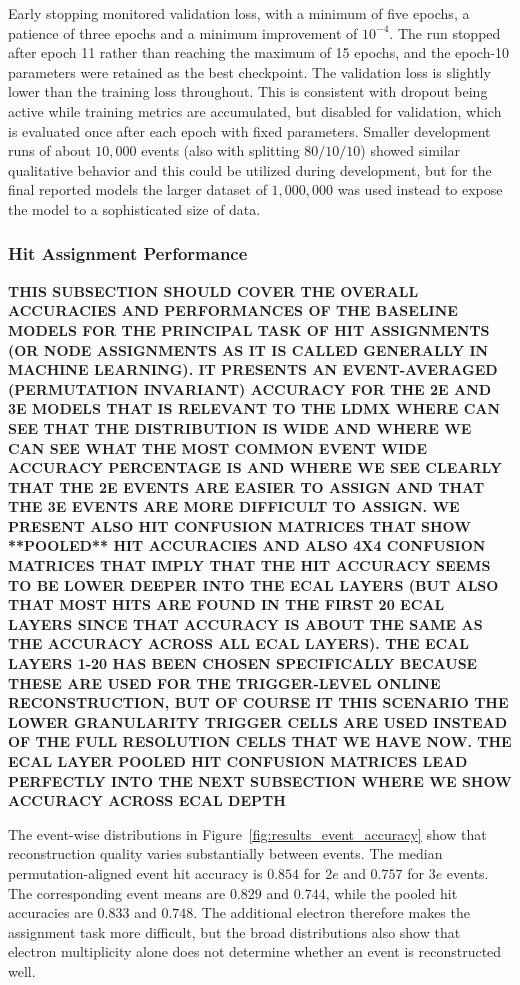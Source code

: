 Early stopping monitored validation loss, with a minimum of five epochs, a
patience of three epochs and a minimum improvement of \(10^{-4}\). The run
stopped after epoch 11 rather than reaching the maximum of 15 epochs, and the
epoch-10 parameters were retained as the best checkpoint. The validation loss
is slightly lower than the training loss throughout. This is consistent with
dropout being active while training metrics are accumulated, but disabled for
validation, which is evaluated once after each epoch with fixed parameters.
Smaller development runs of about $10,000$ events (also with splitting $80/10/10$) showed similar qualitative behavior and this could be utilized during development, but for the final reported models the larger dataset of $1,000,000$ was used instead to expose the model to a sophisticated size of data. 



\clearpage
\subsubsection{Hit Assignment Performance}

\textbf{THIS SUBSECTION SHOULD COVER THE OVERALL ACCURACIES AND PERFORMANCES OF THE BASELINE MODELS FOR THE PRINCIPAL TASK OF HIT ASSIGNMENTS (OR NODE ASSIGNMENTS AS IT IS CALLED GENERALLY IN MACHINE LEARNING). IT PRESENTS AN EVENT-AVERAGED (PERMUTATION INVARIANT) ACCURACY FOR THE 2E AND 3E MODELS THAT IS RELEVANT TO THE LDMX WHERE CAN SEE THAT THE DISTRIBUTION IS WIDE AND WHERE WE CAN SEE WHAT THE MOST COMMON EVENT WIDE ACCURACY PERCENTAGE IS AND WHERE WE SEE CLEARLY THAT THE 2E EVENTS ARE EASIER TO ASSIGN AND THAT THE 3E EVENTS ARE MORE DIFFICULT TO ASSIGN. WE PRESENT ALSO HIT CONFUSION MATRICES THAT SHOW **POOLED** HIT ACCURACIES AND ALSO 4X4 CONFUSION MATRICES THAT IMPLY THAT THE HIT ACCURACY SEEMS TO BE LOWER DEEPER INTO THE ECAL LAYERS (BUT ALSO THAT MOST HITS ARE FOUND IN THE FIRST 20 ECAL LAYERS SINCE THAT ACCURACY IS ABOUT THE SAME AS THE ACCURACY ACROSS ALL ECAL LAYERS). THE ECAL LAYERS 1-20 HAS BEEN CHOSEN SPECIFICALLY BECAUSE THESE ARE USED FOR THE TRIGGER-LEVEL ONLINE RECONSTRUCTION, BUT OF COURSE IT THIS SCENARIO THE LOWER GRANULARITY TRIGGER CELLS ARE USED INSTEAD OF THE FULL RESOLUTION CELLS THAT WE HAVE NOW. THE ECAL LAYER POOLED HIT CONFUSION MATRICES LEAD PERFECTLY INTO THE NEXT SUBSECTION WHERE WE SHOW ACCURACY ACROSS ECAL DEPTH}

The event-wise distributions in Figure~\ref{fig:results_event_accuracy}
show that reconstruction quality varies substantially between events. The
median permutation-aligned event hit accuracy is \(0.854\) for \(2e\) and
\(0.757\) for \(3e\) events. The corresponding event means are \(0.829\) and
\(0.744\), while the pooled hit accuracies are \(0.833\) and \(0.748\).
The additional electron therefore makes the assignment task more difficult,
but the broad distributions also show that electron multiplicity alone does
not determine whether an event is reconstructed well.

